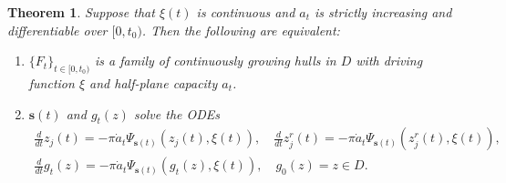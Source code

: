 \documentclass[preprint,12pt]{elsarticle}
\newtheorem{thm}{Theorem}[section]
\theoremstyle{definition}
\newcommand{\slit}{\mathbf{s}}
\begin{document}
\begin{thm} \label{thm:gKLeq}
Suppose that $\xi(t)$ is continuous and
$a_t$ is strictly increasing and differentiable over $[0, t_0)$.
Then the following are equivalent:
\begin{enumerate}
\item \label{cond:nicehull}
$\{F_t\}_{t \in [0, t_0)}$ is a family of continuously growing hulls in $D$
with driving function $\xi$ and half-plane capacity $a_t$.
\item \label{cond:gKLeq}
$\slit(t)$ and $g_t(z)$ solve the ODEs
\begin{gather} 
\frac{d}{dt}z_{j}(t) = -\pi \dot{a}_t \Psi_{\slit(t)}(z_{j}(t),\xi(t)), \quad
\frac{d}{dt}z^{r}_{j}(t) = -\pi \dot{a}_t \Psi_{\slit(t)}(z^{r}_{j}(t),\xi(t)),
\label{eq:gKLs} \\
\frac{d}{dt}g_{t}(z) = -\pi \dot{a}_t \Psi_{\slit(t)}(g_{t}(z),\xi(t)), \quad g_{0}(z)=z \in D.
\label{eq:gKL}
\end{gather}
\end{enumerate}
\end{thm}
\end{document}
